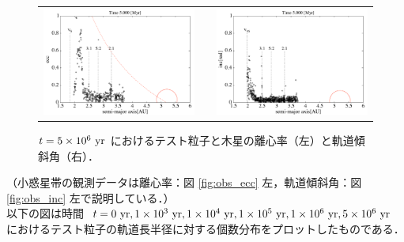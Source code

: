 \documentclass[11pt,a4paper,oneside,onecolumn]{jreport}
\begin{document}
\begin{figure}[H]
\begin{tabular}{ccc}
\begin{minipage}[t]{0.45\hsize}
\centering
\includegraphics[width=8cm]{./image/asteroid_ecc_5Myr.pdf}
\end{minipage} &
\begin{minipage}[t]{0.1\hsize}
\end{minipage} &
\begin{minipage}[t]{0.45\hsize}
\centering
\includegraphics[width=8cm]{./image/asteroid_inc_5Myr.pdf}
\end{minipage}\\
%
\end{tabular}
\caption{$t = 5 \times 10^6\ {\rm yr}$ におけるテスト粒子と木星の離心率（左）と軌道傾斜角（右）．\label{fig:asteroid_ecc_inc_5Myr}}
\end{figure}

（小惑星帯の観測データは離心率：図 \ref{fig:obs_ecc} 左，軌道傾斜角：図 \ref{fig:obs_inc} 左で説明している．）
\\



以下の図は時間 $t = 0\ {\rm yr}, 1 \times 10^3\ {\rm yr}, 1 \times 10^4\ {\rm yr}, 1 \times 10^5\ {\rm yr}, 1 \times 10^6\ {\rm yr}, 5 \times 10^6\ {\rm yr}$ におけるテスト粒子の軌道長半径に対する個数分布をプロットしたものである．
\end{document}
